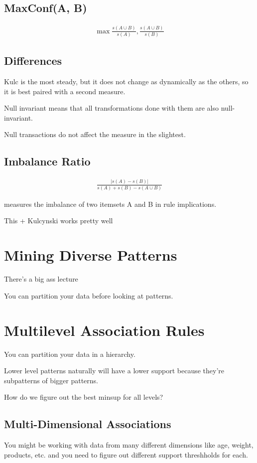 \documentclass[fleqn]{report}
\newcommand{\equations} [1] {
\begin{gather*}
#1
\end{gather*}
}
\begin{document}
\subsection{MaxConf(A, B)}
\equations{
    \max{\frac{s(A \cup B)}{s(A)}, \frac{s(A \cup B)}{s(B)}}
}

\subsection{Differences}
Kulc is the most steady, but it does not change as
dynamically as the others, so it is best paired with a second 
measure.




Null invariant means that all transformations done with them are 
also null-invariant.

Null transactions do not affect the measure in the slightest.

\subsection{Imbalance Ratio}

\equations{
    \frac{|s(A) - s(B)|}{s(A) + s(B) - s(A \cup B)}
}

measures the imbalance of two itemsets A and B in rule implications.

This + Kulcynski works pretty well

\section{Mining Diverse Patterns}
There's a big ass lecture 

You can partition your data before looking at patterns. 

\section{Multilevel Association Rules}
You can partition your data in a hierarchy.

Lower level patterns naturally will have a lower support 
because they're subpatterns of bigger patterns.

How do we figure out the best minsup for all levels?

\subsection{Multi-Dimensional Associations}
You might be working with data from many different dimensions 
like age, weight, products, etc. and you need to figure 
out different support threshholds for each.
\end{document}
